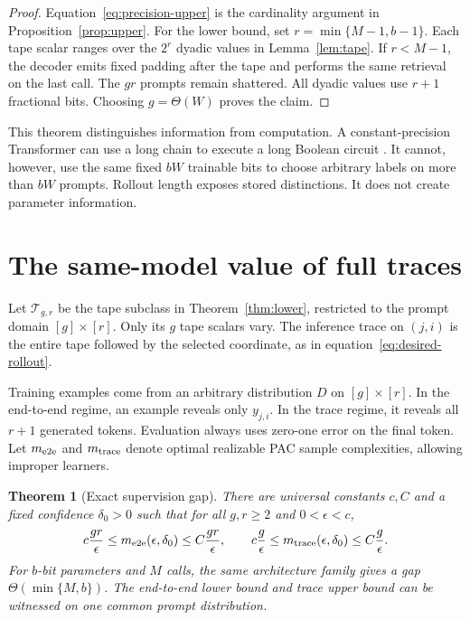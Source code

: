 \documentclass{article}
\newtheorem{theorem}{Theorem}
\newcommand{\1}{\mathbf 1}
\begin{document}
\begin{proof}
Equation~\eqref{eq:precision-upper} is the cardinality argument in Proposition~\ref{prop:upper}. For the lower bound, set $r=\min\{M-1,b-1\}$. Each tape scalar ranges over the $2^r$ dyadic values in Lemma~\ref{lem:tape}. If $r<M-1$, the decoder emits fixed padding after the tape and performs the same retrieval on the last call. The $gr$ prompts remain shattered. All dyadic values use $r+1$ fractional bits. Choosing $g=\Theta(W)$ proves the claim.
\end{proof}

This theorem distinguishes information from computation. A constant-precision Transformer can use a long chain to execute a long Boolean circuit \citep{li2024serial}. It cannot, however, use the same fixed $bW$ trainable bits to choose arbitrary labels on more than $bW$ prompts. Rollout length exposes stored distinctions. It does not create parameter information.

\section{The same-model value of full traces}

Let $\mathcal T_{g,r}$ be the tape subclass in Theorem~\ref{thm:lower}, restricted to the prompt domain $[g]\times[r]$. Only its $g$ tape scalars vary. The inference trace on $(j,i)$ is the entire tape followed by the selected coordinate, as in equation~\eqref{eq:desired-rollout}.

Training examples come from an arbitrary distribution $D$ on $[g]\times[r]$. In the end-to-end regime, an example reveals only $y_{j,i}$. In the trace regime, it reveals all $r+1$ generated tokens. Evaluation always uses zero-one error on the final token. Let $m_{\rm e2e}$ and $m_{\rm trace}$ denote optimal realizable PAC sample complexities, allowing improper learners.

\begin{theorem}[Exact supervision gap]\label{thm:gap}
There are universal constants $c,C$ and a fixed confidence $\delta_0>0$ such that for all $g,r\geq2$ and $0<\epsilon<c$,
\begin{equation}
 c\frac{gr}{\epsilon}
 \leq m_{\rm e2e}(\epsilon,\delta_0)
 \leq C\frac{gr}{\epsilon},
 \qquad
 c\frac{g}{\epsilon}
 \leq m_{\rm trace}(\epsilon,\delta_0)
 \leq C\frac{g}{\epsilon}.
 \label{eq:gap}
\end{equation}
For $b$-bit parameters and $M$ calls, the same architecture family gives a gap $\Theta(\min\{M,b\})$. The end-to-end lower bound and trace upper bound can be witnessed on one common prompt distribution.
\end{theorem}
\end{document}
